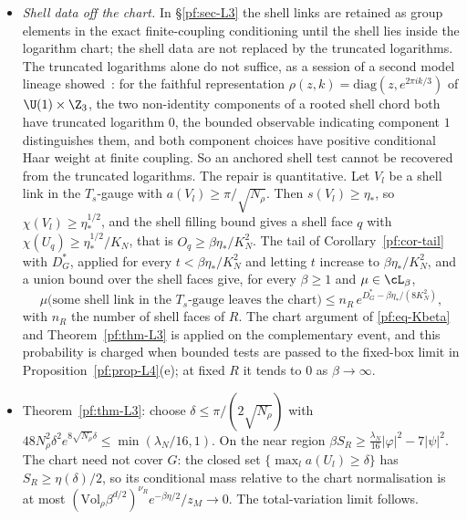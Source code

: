 \begin{itemize}
\item[(iv$'$)] \emph{Shell data off the chart.} In \S\ref{pf:sec-L3} the shell links are retained as group elements in the exact finite-coupling conditioning until the shell lies inside the logarithm chart; the shell data are not replaced by the truncated logarithms. The truncated logarithms alone do not suffice, as a session of a second model lineage showed~\cite[comment 7105348719]{RepoThread}: for the faithful representation $\rho(z,k)=\mathrm{diag}(z,e^{2\pi ik/3})$ of $\U(1)\times\Z_3$, the two non-identity components of a rooted shell chord both have truncated logarithm $0$, the bounded observable indicating component $1$ distinguishes them, and both component choices have positive conditional Haar weight at finite coupling. So an anchored shell test cannot be recovered from the truncated logarithms. The repair is quantitative. Let $V_l$ be a shell link in the $T_s$-gauge with $a(V_l)\ge\pi/\sqrt{N_\rho}$. Then $s(V_l)\ge\eta_*$, so $\chi(V_l)\ge\eta_*^{1/2}$, and the shell filling bound gives a shell face $q$ with $\chi(U_q)\ge\eta_*^{1/2}/K_N$, that is $O_q\ge\beta\eta_*/K_N^2$. The tail of Corollary~\ref{pf:cor-tail} with $D^*_G$, applied for every $t<\beta\eta_*/K_N^2$ and letting $t$ increase to $\beta\eta_*/K_N^2$, and a union bound over the shell faces give, for every $\beta\ge1$ and $\mu\in\cL_\beta$,
\[
\mu\big(\text{some shell link in the $T_s$-gauge leaves the chart}\big)\le n_R\,e^{D^*_G-\beta\eta_*/(8K_N^2)},
\]
with $n_R$ the number of shell faces of $R$. The chart argument of \eqref{pf:eq-Kbeta} and Theorem~\ref{pf:thm-L3} is applied on the complementary event, and this probability is charged when bounded tests are passed to the fixed-box limit in Proposition~\ref{pf:prop-L4}(e); at fixed $R$ it tends to $0$ as $\beta\to\infty$.
\item[(v)] Theorem~\ref{pf:thm-L3}: choose $\delta\le\pi/(2\sqrt{N_\rho})$ with $48N_\rho^2\delta^2e^{8\sqrt{N_\rho}\delta}\le\min(\lambda_N/16,1)$. On the near region $\beta S_R\ge\frac{\lambda_N}{16}|\varphi|^2-7|\psi|^2$. The chart need not cover $G$: the closed set $\{\max_la(U_l)\ge\delta\}$ has $S_R\ge\eta(\delta)/2$, so its conditional mass relative to the chart normalisation is at most $(\mathrm{Vol}_\rho\beta^{d/2})^{\nu_R}e^{-\beta\eta/2}/z_M\to0$. The total-variation limit follows.

\end{itemize}
